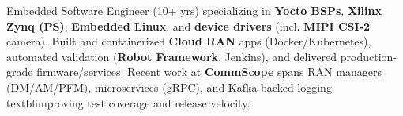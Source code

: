 
\begin{flushleft}
Embedded Software Engineer (10+ yrs) specializing in \textbf{Yocto BSPs}, \textbf{Xilinx Zynq (PS)}, 
\textbf{Embedded Linux}, and \textbf{device drivers} (incl. \textbf{MIPI CSI-2} camera). Built and containerized \textbf{Cloud RAN} 
apps (Docker/Kubernetes), automated validation (\textbf{Robot Framework}, Jenkins), and delivered 
production-grade firmware/services. Recent work at \textbf{CommScope} spans 
RAN managers (DM/AM/PFM), microservices (gRPC), and Kafka-backed logging \\textbf{improving test coverage 
and release velocity}.
\end{flushleft}



